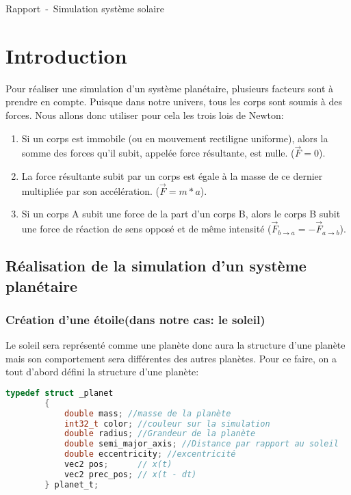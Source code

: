 \documentclass[a4paper,10pt]{article}
\title{\doctitle}
\author{\docauthor}
\date{\docdate}
\newcommand{\doctitle}{Rapport}
\newcommand{\docsubtitle}{Simulation système solaire}
\begin{document}
    \begin{center}
    {\huge \doctitle~-~\docsubtitle}\newline
    \end{center}

    \tableofcontents

    \newpage

    \section{Introduction}

    Pour réaliser une simulation d'un système planétaire, plusieurs facteurs sont à prendre en compte.
    Puisque dans notre univers, tous les corps sont soumis à des forces.
    Nous allons donc utiliser pour cela les trois lois de Newton:

    \begin{enumerate}
        \item Si un corps est immobile (ou en mouvement rectiligne uniforme), alors la somme des forces qu’il subit, appelée force résultante, est nulle. ($\vec{F} = 0$).
        \item La force résultante subit par un corps est égale à la masse de ce dernier multipliée par son accélération. ($\vec{F} = m * a$).
        \item Si un corps A subit une force de la part d’un corps B, alors le corps B subit une force de réaction de sens opposé et de même intensité ($\vec{F}_{b\to{a}} = -\vec{F}_{a\to{b}}$).
    \end{enumerate}
    
    \subsection{Réalisation de la simulation d'un système planétaire}\label{subsec:réalisation-de-la-simulation-d'un-système-planétaire}

    \subsubsection{Création d'une étoile(dans notre cas: le soleil)}

    Le soleil sera représenté comme une planète donc aura la structure d'une planète mais son comportement sera différentes des autres planètes. Pour ce faire, on a tout d'abord défini la structure d'une planète:

    \begin{lstlisting}[language=c,label={lst:lstlisting}]
        typedef struct _planet
        {
            double mass; //masse de la planète
            int32_t color; //couleur sur la simulation
            double radius; //Grandeur de la planète
            double semi_major_axis; //Distance par rapport au soleil
            double eccentricity; //excentricité
            vec2 pos;      // x(t)
            vec2 prec_pos; // x(t - dt)
        } planet_t;
    \end{lstlisting}
\end{document}
